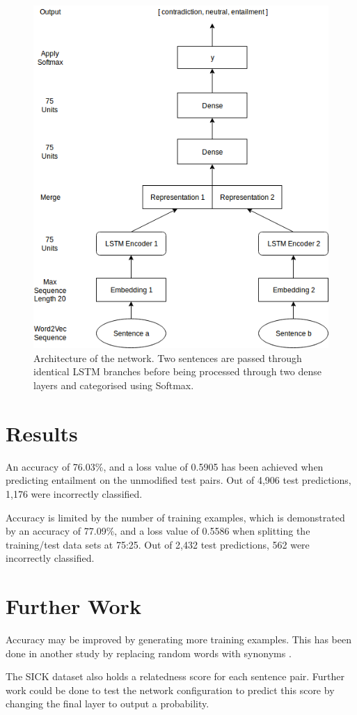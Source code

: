 \documentclass[a4paper,11pt]{article}
\begin{document}
\begin{figure}[!htb]
  \begin{center}
    \includegraphics[width=0.7\linewidth]{architecture}
    \caption{Architecture of the network. Two sentences are passed through identical LSTM branches before being processed through two  dense layers and categorised using Softmax.}
    \label{fig:}
  \end{center}
\end{figure}

\section{Results}
An accuracy of 76.03\%, and a loss value of 0.5905 has been achieved when predicting entailment on the unmodified test pairs. Out of 4,906 test predictions, 1,176 were incorrectly classified. \par Accuracy is limited by the number of training examples, which is demonstrated by an accuracy of 77.09\%, and a loss value of 0.5586 when splitting the training/test data sets at 75:25. Out of 2,432 test predictions, 562 were incorrectly classified.  

\section{Further Work}
Accuracy may be improved by generating more training examples. This has been done in another study by replacing random words with synonyms \cite{mueller2016siamese}. \par
The SICK dataset also holds a relatedness score for each sentence pair. Further work could be done to test the network configuration to predict this score by changing the final layer to output a probability. 
\end{document}
